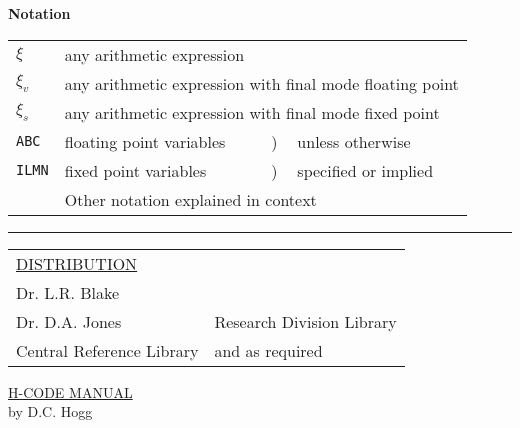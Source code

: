 \documentclass[10pt, a4paper, oneside]{article}
\newif\ifTwoColumn
\newcommand{\myuline}[1]{\uline{#1}}
\newcommand{\mytt}[1]{\texttt{\scriptsize #1}}
\newcommand{\mytt}[1]{\texttt{\small #1}}
\begin{document}
\ifTwoColumn
\begin{multicols}{2}
\small
\fi
\tableofcontents
\listoffigures
\listoftables


\begin{flushleft}
\textbf{Notation} \\
\vspace{1ex}
\begin{tabular}{llll}
$\xi$       & \multicolumn{3}{l}{any arithmetic expression} \\
$\xi_{v}$    & \multicolumn{3}{l}{any arithmetic expression with final mode floating point} \\
$\xi_{s}$    & \multicolumn{3}{l}{any arithmetic expression with final mode fixed point} \\
\mytt{ABC}  & floating point variables & ) & unless otherwise \\
\mytt{ILMN} & fixed point variables & ) & specified or implied \\
 & \multicolumn{3}{l}{Other notation explained in context} \\
\end{tabular}
\end{flushleft}
\ifTwoColumn
\end{multicols}
\fi

\vfill

\par\noindent\rule{\textwidth}{0.4pt}\relax

\vspace{5mm}
\noindent
\begin{tabular}{p{}p{}}
\myuline{DISTRIBUTION} & \\
Dr. L.R. Blake & \\
Dr. D.A. Jones & Research Division Library \\
Central Reference Library & and as required \\
\end{tabular}


\newpage

\setcounter{page}{1}
\cfoot{\thepage}

\begin{center}
\myuline{H-CODE MANUAL} \\
by D.C. Hogg \\
\end{center}
\end{document}
